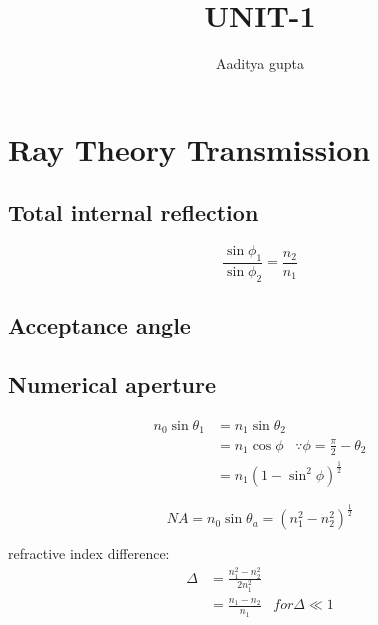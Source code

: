 \documentclass[12pt, onecolumn]{article}
\title{\bf{UNIT-1}}
\author{Aaditya gupta}
\begin{document}
\maketitle

\section{Ray Theory Transmission}
    \subsection{Total internal reflection}
        \begin{equation}
            \frac{\sin\phi_1}{\sin\phi_2} = \frac{n_2}{n_1}
            \label{eq:snell_law}
        \end{equation}

    \subsection{Acceptance angle}

    \subsection{Numerical aperture}
        \begin{equation}
            \begin{aligned}
                n_0 \sin\theta_1 &= n_1 \sin\theta_2 \\
                            &= n_1 \cos\phi  \;\;\; \because \phi = \frac{\pi}{2} - \theta_2 \\
                            &= n_1 (1 - \sin^2 \phi)^\frac{1}{2}
            \end{aligned}
        \end{equation}
        
        \begin{equation}
            NA = n_0 \sin\theta_a = (n_1^2 - n_2^2)^\frac{1}{2}
        \end{equation}
        
        refractive index difference:
        \begin{equation}
            \begin{aligned}
                \Delta   &= \frac{n_1^2 - n_2^2}{2n_1^2} \\
                    &= \frac{n_1 - n_2}{n_1} \;\;\; for \Delta \ll 1
            \end{aligned}
        \end{equation}
        
\end{document}
